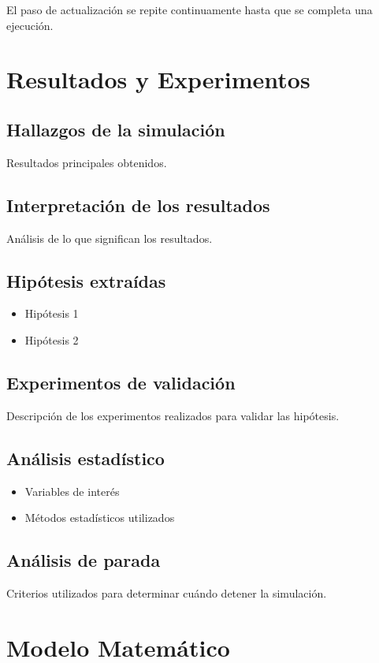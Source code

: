 \documentclass[12pt, a4paper]{article}
\begin{document}
El paso de actualización se repite continuamente hasta que se completa una ejecución.

\section{Resultados y Experimentos} \label{S3}
\subsection*{Hallazgos de la simulación}
Resultados principales obtenidos.

\subsection*{Interpretación de los resultados}
Análisis de lo que significan los resultados.

\subsection*{Hipótesis extraídas}
\begin{itemize}
    \item Hipótesis 1
    \item Hipótesis 2
\end{itemize}

\subsection*{Experimentos de validación}
Descripción de los experimentos realizados para validar las hipótesis.

\subsection*{Análisis estadístico}
\begin{itemize}
    \item Variables de interés
    \item Métodos estadísticos utilizados
\end{itemize}

\subsection*{Análisis de parada}
Criterios utilizados para determinar cuándo detener la simulación.

\section{Modelo Matemático} \label{S4}
\end{document}
